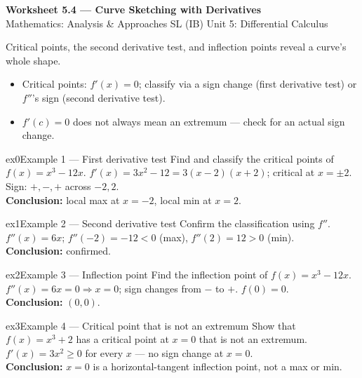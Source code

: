 \documentclass[11pt]{article}
\begin{document}
\begin{center}
{\LARGE\bfseries\color{titleblue}Worksheet 5.4 --- Curve Sketching with Derivatives}\\[2pt]
{\small Mathematics: Analysis \& Approaches SL (IB) \textperiodcentered{} Unit 5: Differential Calculus}
\end{center}

\begin{ideabox}
Critical points, the second derivative test, and inflection points reveal a curve's whole shape.
\begin{itemize}[leftmargin=*,itemsep=2pt]
  \item Critical points: $f'(x)=0$; classify via a sign change (first derivative test) or $f''$'s sign (second derivative test).
  \item $f'(c)=0$ does not always mean an extremum --- check for an actual sign change.
\end{itemize}
\end{ideabox}


\begin{example}{ex0}{Example 1 --- First derivative test}
Find and classify the critical points of $f(x)=x^3-12x$.\soln
$f'(x)=3x^2-12=3(x-2)(x+2)$; critical at $x=\pm2$. Sign: $+,-,+$ across $-2,2$.\\[3pt]\textbf{Conclusion:} local max at $x=-2$, local min at $x=2$.
\end{example}

\begin{example}{ex1}{Example 2 --- Second derivative test}
Confirm the classification using $f''$.\soln
$f''(x)=6x$; $f''(-2)=-12<0$ (max), $f''(2)=12>0$ (min).\\[3pt]\textbf{Conclusion:} confirmed.
\end{example}

\begin{example}{ex2}{Example 3 --- Inflection point}
Find the inflection point of $f(x)=x^3-12x$.\soln
$f''(x)=6x=0\Rightarrow x=0$; sign changes from $-$ to $+$. $f(0)=0$.\\[3pt]\textbf{Conclusion:} $(0,0)$.
\end{example}

\begin{example}{ex3}{Example 4 --- Critical point that is not an extremum}
Show that $f(x)=x^3+2$ has a critical point at $x=0$ that is not an extremum.\soln
$f'(x)=3x^2\geq0$ for every $x$ --- no sign change at $x=0$.\\[3pt]\textbf{Conclusion:} $x=0$ is a horizontal-tangent inflection point, not a max or min.
\end{example}
\end{document}
